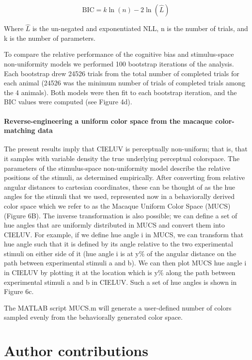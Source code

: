 \begin{equation}
    \text{BIC} = k\ln(n)-2\ln(\hat{L})
\end{equation}

Where $\hat{L}$ is the un-negated and exponentiated NLL, n is the number of trials, and k is the number of parameters.

To compare the relative performance of the cognitive bias and stimulus-space non-uniformity models we performed 100 bootstrap iterations of the analysis. 
Each bootstrap drew 24526 trials from the total number of completed trials for each animal (24526 was the minimum number of trials of completed trials among the 4 animals). 
Both models were then fit to each bootstrap iteration, and the BIC values were computed (see Figure 4d).  %

\paragraph{Reverse-engineering a uniform color space from the macaque color-matching data}

The present results imply that CIELUV is perceptually non-uniform; that is, that it samples with variable density the true underlying perceptual colorspace. 
The parameters of the stimulus-space non-uniformity model describe the relative positions of the stimuli, as determined empirically. 
After converting from relative angular distances to cartesian coordinates, these can be thought of as the hue angles for the stimuli that we used, represented now in a behaviorally derived color space which we refer to as the Macaque Uniform Color Space (MUCS) (Figure 6B). 
The inverse transformation is also possible; we can define a set of hue angles that are uniformly distributed in MUCS and convert them into CIELUV. 
For example, if we define hue angle i in MUCS, we can transform that hue angle such that it is defined by its angle relative to the two experimental stimuli on either side of it (hue angle i is at y\% of the angular distance on the path between experimental stimuli a and b). 
We can then plot MUCS hue angle i in CIELUV by plotting it at the location which is y\% along the path between experimental stimuli a and b in CIELUV. Such a set of hue angles is shown in Figure 6c. 

The MATLAB script MUCS.m will generate a user-defined number of colors sampled evenly from the behaviorally generated color space. 

\section{Author contributions}

